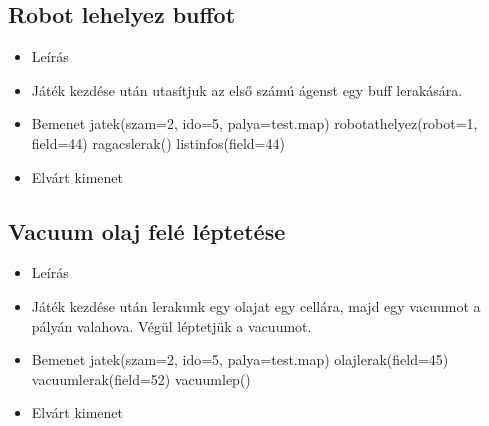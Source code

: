 \subsection{Robot lehelyez buffot}
\begin{itemize}
	\item Leírás\newline
	\item Játék kezdése után utasítjuk az első számú ágenst egy buff lerakására.
	\item Bemenet\newline	
		jatek(szam=2, ido=5, palya=test.map) \newline
		robotathelyez(robot=1, field=44) \newline
		ragacslerak() \newline
		listinfos(field=44) \newline
	\item Elvárt kimenet\newline
\end{itemize}

\subsection{Vacuum olaj felé léptetése}
\begin{itemize}
	\item Leírás\newline
	\item Játék kezdése után lerakunk egy olajat egy cellára, majd egy vacuumot a pályán valahova. Végül léptetjük a vacuumot.
	\item Bemenet\newline
		jatek(szam=2, ido=5, palya=test.map) \newline
		olajlerak(field=45) \newline
		vacuumlerak(field=52) \newline
		vacuumlep() \newline
	\item Elvárt kimenet\newline
\end{itemize}

